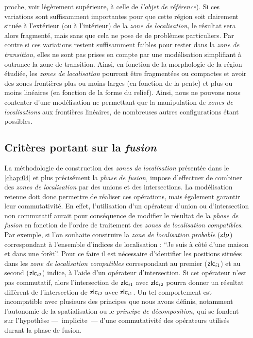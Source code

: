 proche, voir légèrement supérieure, à celle de \emph{l'objet de
  référence}). Si ces variations sont suffisamment importantes pour
que cette région soit clairement située à l'extérieur (ou à
l'intérieur) de la \emph{zone de localisation,} le résultat sera alors
fragmenté, mais sans que cela ne pose de de problèmes
particuliers. Par contre si ces variations restent suffisamment
faibles pour rester dans la \emph{zone de transition,} elles ne sont
pas prises en compte par une modélisation simplifiant à outrance la
zone de transition. Ainsi, en fonction de la morphologie de la région
étudiée, les \emph{zones de localisation} pourront être fragmentées ou
compactes et avoir des zones frontières plus ou moins larges (en
fonction de la pente) et plus ou moins linéaires (en fonction de la
forme du relief). Ainsi, nous ne pouvons nous contenter d'une
modélisation ne permettant que la manipulation de \emph{zones de
  localisations} aux frontières linéaires, de nombreuses autres
configurations étant possibles.

%   

\subsection{Critères portant sur la \emph{fusion}}

La méthodologie de construction des \emph{zones de localisation}
présentée dans le \autoref{chap:04} et plus précisément la \emph{phase
  de fusion,} impose d'effectuer de combiner des \emph{zones de
  localisation} par des unions et des intersections. La modélisation
retenue doit donc permettre de réaliser ces opérations, mais également
garantir leur commutativité. En effet, l'utilisation d'un opérateur
d'union ou d'intersection non commutatif aurait pour conséquence de
modifier le résultat de la \emph{phase de fusion} en fonction de
l'ordre de traitement des \emph{zones de localisation
  compatibles}. Par exemple, si l'on souhaite construire la \emph{zone
  de localisation probable} ($\text{\textsl{zlp}}$) correspondant à
l'ensemble d'indices de localisation : \enquote{Je suis à côté d'une
  maison et dans une forêt}. Pour ce faire il est nécessaire
d'identifier les positions situées dans les \emph{zone de localisation
  compatibles} correspondant au premier ($\text{\textsf{zlc}}_{i1}$)
et au second ($\text{\textsf{zlc}}_{i2}$) indice, à l'aide d'un
opérateur d'intersection. Si cet opérateur n'est pas commutatif, alors
l'intersection de $\text{\textsf{zlc}}_{i1}$ avec
$\text{\textsf{zlc}}_{i2}$ pourra donner un résultat différent de
l'intersection de $\text{\textsf{zlc}}_{i2}$ avec
$\text{\textsf{zlc}}_{i1}$. Un tel comportement est incompatible avec
plusieurs des principes que nous avons définis, notamment l'autonomie
de la spatialisation ou le \emph{principe de décomposition,} qui se
fondent sur l'hypothèse ---~implicite~--- d'une commutativité des
opérateurs utilisés durant la phase de fusion.


